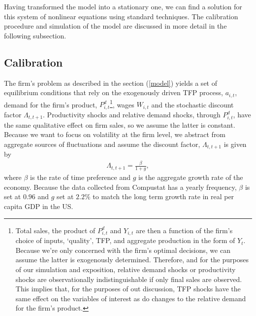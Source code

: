 \documentclass{_latex/house}
\begin{document}
Having transformed the model into a stationary one, we can find a solution for this system of nonlinear equations using standard techniques. The calibration procedure and simulation of the model are discussed in more detail in the following subsection.
\subsection{Calibration} \label{calibration}
The firm's problem as described in the section (\ref{model}) yields a set of equilibrium conditions that rely on the exogenously driven TFP process, $a_{i,t}$, demand for the firm's product, $P_{i,t}^{d}$\footnote{Total sales, the product of $P_{i,t}^{d}$ and $Y_{i,t}$ are then a function of the firm's choice of inputs, \textquoteleft quality\textquoteright, TFP, and aggregate production in the form of $Y_{t}$. Because we're only concerned with the firm's optimal decisions, we can assume the latter is exogenously determined. Therefore, and for the purposes of our simulation and exposition, relative demand shocks or productivity shocks are observationally indistinguishable if only final sales are observed. This implies that, for the purposes of out discussion, TFP shocks have the same effect on the variables of interest as do changes to the relative demand for the firm's product.}, wages $W_{i,t}$ and the stochastic discount factor $\Lambda_{t,t+1}$. Productivity shocks and relative demand shocks, through $P_{i,t}^{d}$, have the same qualitative effect on firm sales, so we assume the latter is constant. Because we want to focus on volatility at the firm level, we abstract from aggregate sources of fluctuations and assume the discount factor, $\Lambda_{t,t+1}$ is given by
\begin{align*}
\Lambda_{t,t+1}=\frac{\beta}{1+g},
\end{align*}
where $\beta$ is the rate of time preference and $g$ is the aggregate growth rate of the economy. Because the data collected from Compustat has a yearly frequency, $\beta$ is set at $0.96$ and $g$ set at $2.2\%$ to match the long term growth rate in real per capita GDP in the US.
\end{document}
